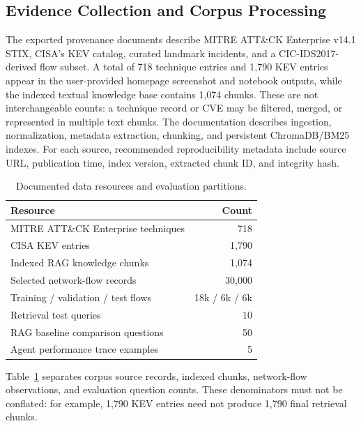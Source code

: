 \documentclass[journal,twoside]{IEEEtran}
\begin{document}
\subsection{Evidence Collection and Corpus Processing}
The exported provenance documents describe MITRE ATT\&CK Enterprise v14.1 STIX, CISA's KEV catalog, curated landmark incidents, and a CIC-IDS2017-derived flow subset. A total of 718 technique entries and 1,790 KEV entries appear in the user-provided homepage screenshot and notebook outputs, while the indexed textual knowledge base contains 1,074 chunks. These are not interchangeable counts: a technique record or CVE may be filtered, merged, or represented in multiple text chunks. The documentation describes ingestion, normalization, metadata extraction, chunking, and persistent ChromaDB/BM25 indexes. For each source, recommended reproducibility metadata include source URL, publication time, index version, extracted chunk ID, and integrity hash.

\begin{table}[!t]
\caption{Documented data resources and evaluation partitions.}
\label{tab:data}
\centering\footnotesize
\begin{tabular}{p{}r}
\toprule Resource & Count\\ \midrule
MITRE ATT\&CK Enterprise techniques & 718\\
CISA KEV entries & 1,790\\
Indexed RAG knowledge chunks & 1,074\\
Selected network-flow records & 30,000\\
Training / validation / test flows & 18k / 6k / 6k\\
Retrieval test queries & 10\\
RAG baseline comparison questions & 50\\
Agent performance trace examples & 5\\ \bottomrule
\end{tabular}
\end{table}

Table~\ref{tab:data} separates corpus source records, indexed chunks, network-flow observations, and evaluation question counts. These denominators must not be conflated: for example, 1,790 KEV entries need not produce 1,790 final retrieval chunks.
\end{document}

